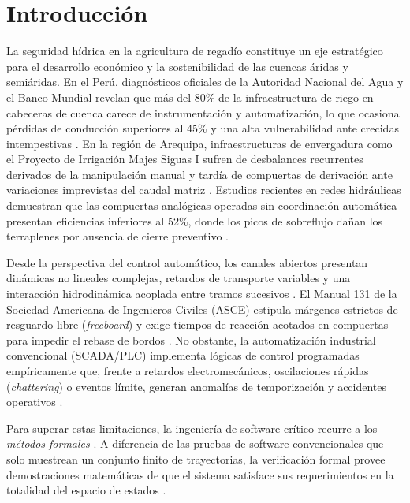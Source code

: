 \documentclass[conference]{IEEEtran}
\begin{document}
\section{Introducción}
La seguridad hídrica en la agricultura de regadío constituye un eje estratégico para el desarrollo económico y la sostenibilidad de las cuencas áridas y semiáridas. En el Perú, diagnósticos oficiales de la Autoridad Nacional del Agua y el Banco Mundial revelan que más del 80\% de la infraestructura de riego en cabeceras de cuenca carece de instrumentación y automatización, lo que ocasiona pérdidas de conducción superiores al 45\% y una alta vulnerabilidad ante crecidas intempestivas \cite{bancomundial2016seguridad}. En la región de Arequipa, infraestructuras de envergadura como el Proyecto de Irrigación Majes Siguas I sufren de desbalances recurrentes derivados de la manipulación manual y tardía de compuertas de derivación ante variaciones imprevistas del caudal matriz \cite{zapana2018respuestas}. Estudios recientes en redes hidráulicas demuestran que las compuertas analógicas operadas sin coordinación automática presentan eficiencias inferiores al 52\%, donde los picos de sobreflujo dañan los terraplenes por ausencia de cierre preventivo \cite{dominguez2024impacto}.

Desde la perspectiva del control automático, los canales abiertos presentan dinámicas no lineales complejas, retardos de transporte variables y una interacción hidrodinámica acoplada entre tramos sucesivos \cite{hernandez2020control}. El Manual 131 de la Sociedad Americana de Ingenieros Civiles (ASCE) estipula márgenes estrictos de resguardo libre (\textit{freeboard}) y exige tiempos de reacción acotados en compuertas para impedir el rebase de bordos \cite{wahlin2016canal}. No obstante, la automatización industrial convencional (SCADA/PLC) implementa lógicas de control programadas empíricamente que, frente a retardos electromecánicos, oscilaciones rápidas (\textit{chattering}) o eventos límite, generan anomalías de temporización y accidentes operativos \cite{gleirscher2020formal}.

Para superar estas limitaciones, la ingeniería de software crítico recurre a los \textit{métodos formales} \cite{woodcock2009formal,clarke1996formal}. A diferencia de las pruebas de software convencionales que solo muestrean un conjunto finito de trayectorias, la verificación formal provee demostraciones matemáticas de que el sistema satisface sus requerimientos en la totalidad del espacio de estados \cite{sinha2019survey}.
\end{document}
